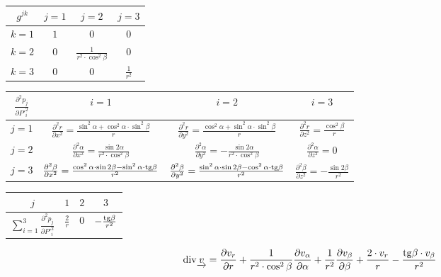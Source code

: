 \begin{tabular}{| c || c | c | c |}
\hline
\(g^{jk}\) & \(j=1\) & \(j=2\) & \(j=3\) \\
\hline
\hline
\(k=1\) & \(1\) & \(0\) & \(0\) \\
\hline
\(k=2\) & \(0\) & \(\frac{1}{r^2 \cdot \cos^2 \beta}\) & \(0\) \\
\hline
\(k=3\) & \(0\) & \(0\) & \(\frac{1}{r^2}\) \\
\hline
\end{tabular}

\begin{tabular}{| c || c | c | c |}
\hline
\(\frac{\partial^2 p_j}{\partial P'^2_i}\) & \(i=1\) & \(i=2\) & \(i=3\) \\
\hline
\hline
\(j=1\) & \(\frac{\partial^2 r}{\partial x^2} = \frac{\sin^2 \alpha + \cos^2 \alpha \cdot \sin^2 \beta}{r}\) & \(\frac{\partial^2 r}{\partial y^2} = \frac{\cos^2 \alpha + \sin^2 \alpha \cdot \sin^2 \beta}{r}\) & \(\frac{\partial^2 r}{\partial z^2} = \frac{\cos^2 \beta}{r}\) \\
\hline
\(j=2\) & \(\frac{\partial^2 \alpha}{\partial x^2} = \frac{\sin 2\alpha}{r^2 \cdot \cos^2 \beta}\) & \(\frac{\partial^2 \alpha}{\partial y^2} = -\frac{\sin 2\alpha}{r^2 \cdot \cos^2 \beta}\) & \(\frac{\partial^2 \alpha}{\partial z^2} = 0\) \\
\hline
\(j=3\) & \(\frac{\partial^2 \beta}{\partial x^2} = \frac{\cos^2 \alpha \cdot \sin 2 \beta - \sin^2 \alpha \cdot \mathrm{tg} \beta}{r^2}\) & \(\frac{\partial^2 \beta}{\partial y^2} = \frac{\sin^2 \alpha \cdot \sin 2 \beta - \cos^2 \alpha \cdot \mathrm{tg} \beta}{r^2}\) & \(\frac{\partial^2 \beta}{\partial z^2} = -\frac{\sin 2 \beta}{r^2}\) \\
\hline
\end{tabular}

\begin{tabular}{| c || c | c | c |}
\hline
\(j\) & \(1\) & \(2\) & \(3\) \\
\hline
\hline
\(\sum_{i=1}^3 \frac{\partial^2 p_j}{\partial P'^2_i}\) & \(\frac{2}{r}\) & 0 & \(-\frac{\mathrm{tg} \beta}{r^2}\) \\
\hline
\end{tabular}

\begin{equation}
\label{eq:sfericky_ss_div}
\mathrm{div}{\underrightarrow{v}} = \frac{\partial v_r}{\partial r} + \frac{1}{r^2 \cdot \cos^2 \beta} \frac{\partial v_{\alpha}}{\partial \alpha} + \frac{1}{r^2} \frac{\partial v_{\beta}}{\partial \beta} + \frac{2 \cdot v_r}{r} - \frac{\mathrm{tg} \beta \cdot v_{\beta}}{r^2}
\end{equation}

